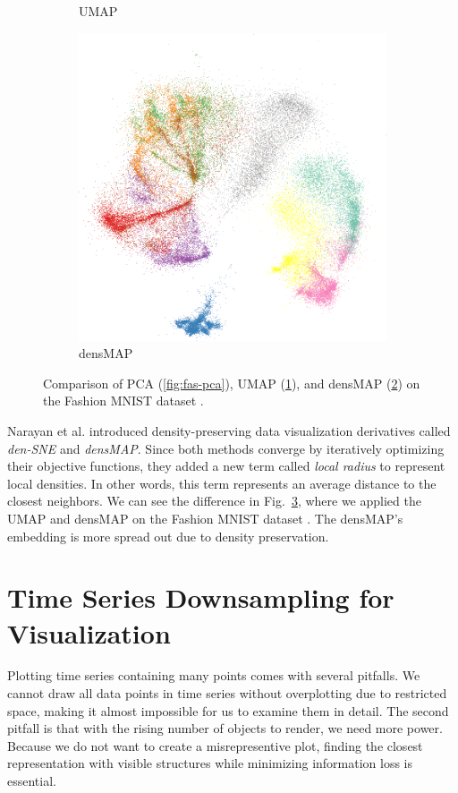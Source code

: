 \begin{figure}[ht]
\begin{subfigure}[b]{0.3\textwidth}
        \caption{UMAP}
        \label{fig:fas-umap}
    \end{subfigure}
    \begin{subfigure}[b]{0.3\textwidth}
        \centering
        \includegraphics[width=\textwidth]{img/fashion-densmap.png}
        \caption{densMAP}
        \label{fig:fas-densmap}
    \end{subfigure}
    \caption{Comparison of PCA (\ref{fig:fas-pca}), UMAP (\ref{fig:fas-umap}), and densMAP (\ref{fig:fas-densmap}) on the Fashion MNIST dataset \cite{vis:fashion-mnist}.}
    \label{fig:fashion}
\end{figure}

Narayan et al. \cite{vis:densMAP} introduced density-preserving data visualization derivatives called \textit{den-SNE} and \textit{densMAP}. Since both methods converge by iteratively optimizing their objective functions, they added a new term called \textit{local radius} to represent local densities. In other words, this term represents an average distance to the closest neighbors. We can see the difference in Fig.~\ref{fig:fashion}, where we applied the UMAP and densMAP on the Fashion MNIST dataset \cite{vis:fashion-mnist}. The densMAP's embedding is more spread out due to density preservation.

\section{Time Series Downsampling for Visualization}
Plotting time series containing many points comes with several pitfalls. We cannot draw all data points in time series without overplotting due to restricted space, making it almost impossible for us to examine them in detail. The second pitfall is that with the rising number of objects to render, we need more power. Because we do not want to create a misrepresentive plot, finding the closest representation with visible structures while minimizing information loss is essential.

